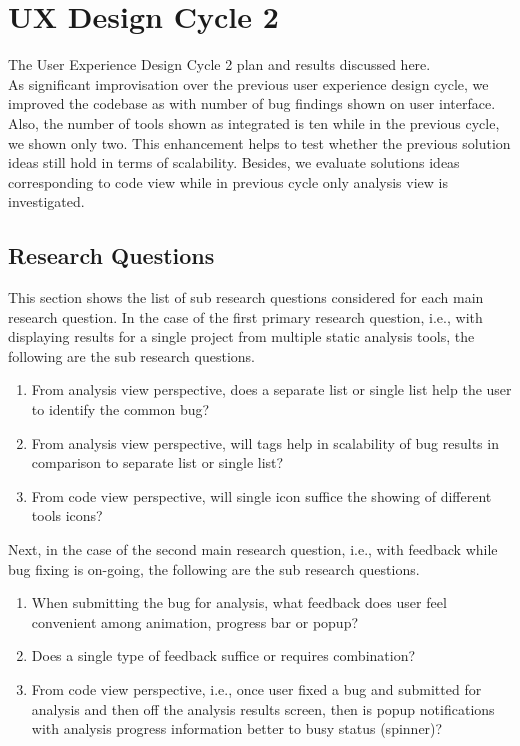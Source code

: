 \chapter{UX Design Cycle 2}
\label{ch:ux2-cycle_report}

The User Experience Design Cycle 2 plan and results discussed here. \\

As significant improvisation over the previous user experience design cycle, we improved the codebase as with number of bug findings shown on user interface. Also, the number of tools shown as integrated is ten while in the previous cycle, we shown only two. This enhancement helps to test whether the previous solution ideas still hold in terms of scalability. Besides, we evaluate solutions ideas corresponding to code view while in previous cycle only analysis view is investigated. \\

\section{Research Questions}

This section shows the list of sub research questions considered for each main research question. In the case of the first primary research question, i.e., with displaying results for a single project from multiple static analysis tools, the following are the sub research questions. \\

\begin{enumerate}
\item From analysis view perspective, does a separate list or single list help the user to identify the common bug?
\item From analysis view perspective, will tags help in scalability of bug results in comparison to separate list or single list?
\item From code view perspective, will single icon suffice the showing of different tools icons?
\end{enumerate} 

Next, in the case of the second main research question, i.e., with feedback while bug fixing is on-going, the following are the sub research questions. \\

\begin{enumerate}
\item When submitting the bug for analysis, what feedback does user feel convenient among animation, progress bar or popup?
\item Does a single type of feedback suffice or requires combination?
\item From code view perspective, i.e., once user fixed a bug and submitted for analysis and then off the analysis results screen, then is popup notifications with analysis progress information better to busy status (spinner)?
\end{enumerate} 



